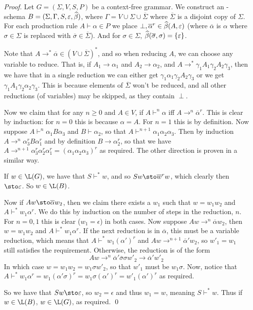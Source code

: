 \documentclass{llncs}
\begin{document}
\begin{proof}

    Let $G=(\Sigma,V,S,P)$ be a context-free grammar.
    We construct an \sNBR-schema $B=(\Sigma,\Gamma,S,\varepsilon,\widehat\beta)$, where $\Gamma=V\cup\Sigma\cup\overline\Sigma$ where
    $\overline\Sigma$ is a disjoint copy of $\Sigma$.
    For each production rule $A\vdash\alpha\in P$ we place $\perp,\overline\alpha^r\in\widehat\beta(A,\varepsilon)$ (where $\overline\alpha$
    is $\alpha$ where $\sigma\in\Sigma$ is replaced with $\overline\sigma\in\overline\Sigma$).
    And for $\sigma\in\Sigma$, $\hb(\overline\sigma,\sigma)=\set{\epsilon}$.

    Note that $A\to^*\overline\alpha\in(V\cup\overline\Sigma)^*$, and so when reducing $A$, we can choose any variable to
    reduce.
    That is, if $A_1\to\alpha_1$ and $A_2\to\alpha_2$, and $A\to^*\gamma_1A_1\gamma_2A_2\gamma_3$, then we have that in a single
    reduction we can either get $\gamma_1\alpha_1\gamma_2A_2\gamma_3$ or we get  $\gamma_1A_1\gamma_2\alpha_2\gamma_3$.
    This is because elements of $\overline\Sigma$ won't be reduced, and all other reductions (of variables) may be skipped, as
    they contain $\perp$.

    Now we claim that for any $n\geq0$ and $A\in V$, if $A\vdash^n\alpha$ iff $A\to^n\overline\alpha^r$.
    This is clear by induction: for $n=0$ this is because $\alpha=A$.
    For $n=1$ this is by definition.
    Now suppose $A\vdash^n\alpha_1B\alpha_3$ and $B\vdash\alpha_2$, so that $A\vdash^{n+1}\alpha_1\alpha_2\alpha_3$.
    Then by induction $A\to^n\alpha_3^rB\alpha_1^r$ and by definition $B\to\alpha_2^r$, so that we have
    $A\to^{n+1}\alpha_3^r\alpha_2^r\alpha_1^r=(\alpha_1\alpha_2\alpha_3)^r$ as required.
    The other direction is proven in a similar way.

    If $w\in\L(G)$, we have that $S\vdash^*w$, and so $Sw\sto\overline w^rw$, which clearly then $\sto\epsilon$.
    So $w\in\L(B)$.

    Now if $Aw\sto\overline\alpha w_2$, then we claim there exists a $w_1$ such that $w=w_1w_2$ and $A\vdash^*w_1\alpha^r$.
    We do this by induction on the number of steps in the reduction, $n$.
    For $n=0,1$ this is clear ($w_1=\epsilon$) in both cases.
    Now suppose $Aw\to^n\overline\alpha w_2$, then $w=w_1w_2$ and $A\vdash^*w_1\alpha^r$.
    If the next reduction is in $\overline\alpha$, this must be a variable reduction, which means that $A\vdash^*w_1(\alpha')^r$
    and $Aw\to^{n+1}\overline\alpha' w_2$, so $w'_1=w_1$ still satisfies the requirement.
    Otherwise, the reduction is of the form
    $$ Aw\to^n\overline\alpha'\overline\sigma\sigma w'_2 \to\overline\alpha'w'_2 $$
    In which case $w=w_1w_2=w_1\sigma w'_2$, so that $w'_1$ must be $w_1\sigma$.
    Now, notice that $A\vdash^*w_1\alpha^r=w_1(\alpha'\sigma)^r=w_1\sigma(\alpha')^r=w'_1(\alpha')^r$ as required.

    So we have that $Sw\sto\epsilon$, so $w_2=\epsilon$ and thus $w_1=w$, meaning $S\vdash^*w$.
    Thus if $w\in\L(B)$, $w\in\L(G)$, as required.
    \qed

\end{proof}
\end{document}
